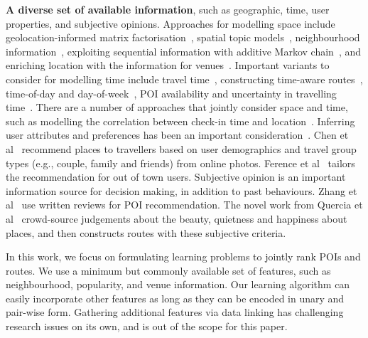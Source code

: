 {\bf A diverse set of available information},
such as geographic, time, user properties, and subjective opinions.
Approaches for modelling space include geolocation-informed matrix factorisation~\cite{lian2014geomf}, spatial topic models~\cite{hu2013spatialtopic}, neighbourhood information~\cite{liu2014exploiting}, exploiting sequential information with additive Markov chain~\cite{zhang2014lore}, and enriching location with the information for venues~\cite{deveaud2014importance,deveaud2015experiments}.
Important variants to consider for modelling time include travel time~\cite{gao2013temporal},
constructing time-aware routes~\cite{yuan2013timeaware,hsieh2014mining}, time-of-day and day-of-week~\cite{chen2015tripplanner}, POI availability and uncertainty in travelling time~\cite{zhang2015personalized}. There are a number of approaches that jointly consider space and time\cite{yuan2014graph,zhang2015location}, such as modelling the correlation between check-in time and location~\cite{gao2013temporal}.
Inferring user attributes and preferences has been an important consideration~\cite{liu2013personalized}.
Chen et al~\cite{chen2013people} recommend places to travellers based on 
user demographics
and travel group types (e.g., couple, family and friends) from online photos.
Ference et al~\cite{ference2013location} tailors the recommendation for out of town users.
Subjective opinion is an important information source for decision making, in addition to past behaviours. Zhang et al~\cite{Zhang2015OOP} use written reviews for POI recommendation.
The novel work from Quercia et al~\cite{ht14} crowd-source judgements about the beauty, quietness and happiness about places, and then constructs routes with these subjective criteria.

In this work, we focus on formulating learning problems to jointly rank POIs and routes. We use a minimum but commonly available set of features, such as neighbourhood, popularity, and venue information. Our learning algorithm can easily incorporate other features as long as they can be encoded in unary and pair-wise form. 
Gathering additional features via data linking %
has challenging research issues on its own, and is out of the scope for this paper.

